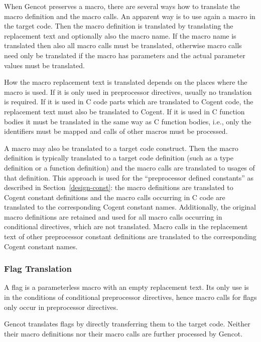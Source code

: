 When Gencot preserves a macro, there are several ways how to translate the macro definition and the macro calls.
An apparent way is to use again a macro in the target code. Then the macro definition is translated by translating
the replacement text and optionally also the macro name. If the macro name is translated then also all macro calls
must be translated, otherwise macro calls need only be translated if the macro has parameters and the actual 
parameter values must be translated.

How the macro replacement text is translated depends on the places where the macro is used. If it is only used 
in preprocessor directives, usually no translation is required. If it is used in C code parts which are translated to
Cogent code, the replacement text must also be translated to Cogent. If it is used in C function bodies it must
be translated in the same way as C function bodies, i.e., only the identifiers must be mapped and calls of other
macros must be processed.

A macro may also be translated to a target code construct. Then the macro definition is typically translated to 
a target code definition (such as a type definition or a function definition) and the macro calls are translated
to usages of that definition. This approach is used for the ``preprocessor defined constants'' as described in 
Section~\ref{design-const}: the macro definitions are translated to Cogent constant definitions and the macro 
calls occurring in C code are translated to the corresponding Cogent constant names. Additionally, the original
macro definitions are retained and used for all macro calls occurring in conditional directives, which are not
translated. Macro calls in the replacement text of other preprocessor constant definitions are translated to 
the corresponding Cogent constant names.

\subsubsection{Flag Translation}

A flag is a parameterless macro with an empty replacement text. Its only use is in the conditions of 
conditional preprocessor directives, hence macro calls for flags only occur in preprocessor directives.

Gencot translates flags by directly transferring them to the target code. Neither their macro definitions 
nor their macro calls are further processed by Gencot.

